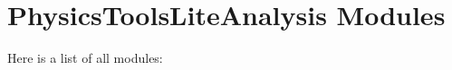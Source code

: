 \section{Physics\-Tools\-Lite\-Analysis Modules}
Here is a list of all modules:\begin{CompactList}
\item {}
\end{CompactList}
